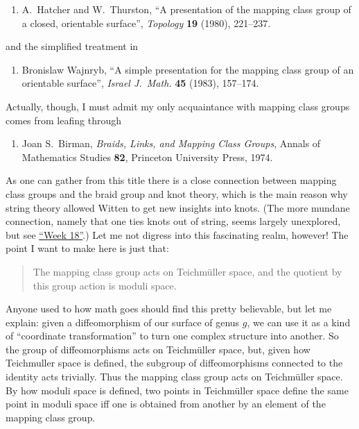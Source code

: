 \documentclass{article}
\def\tightlist{}
\begin{document}
\begin{enumerate}
\def\labelenumi{\arabic{enumi})}
\setcounter{enumi}{4}
\tightlist
\item
  A.\ Hatcher and W.\ Thurston, ``A presentation of the mapping class group of a closed, orientable
  surface'', \emph{Topology} \textbf{19}
  (1980), 221--237.
\end{enumerate}
\noindent
and the simplified treatment in

\begin{enumerate}
\def\labelenumi{\arabic{enumi})}
\setcounter{enumi}{5}
\tightlist
\item
  Bronislaw Wajnryb, ``A simple presentation for the mapping class group of an orientable
  surface'', \emph{Israel J.\ Math.} \textbf{45} (1983), 157--174.
\end{enumerate}
\noindent
Actually, though, I must admit my only acquaintance with mapping class
groups comes from leafing through

\begin{enumerate}
\def\labelenumi{\arabic{enumi})}
\setcounter{enumi}{6}
\tightlist
\item
  Joan S.\ Birman, \emph{Braids, Links, and Mapping Class Groups},
  Annals of Mathematics Studies \textbf{82}, Princeton
  University Press, 1974.
\end{enumerate}

As one can gather from this title there is a close connection between
mapping class groups and the braid group and knot theory, which is the
main reason why string theory allowed Witten to get new insights into
knots. (The more mundane connection, namely that one ties knots out of
string, seems largely unexplored, but see
\protect\hyperlink{week18}{``Week 18''}.) Let me not digress into this
fascinating realm, however! The point I want to make here is just that:

\begin{quote}
The mapping class group acts on Teichm\"uller space, and the quotient by
this group action is moduli space.
\end{quote}

Anyone used to how math goes should find this pretty believable, but let
me explain: given a diffeomorphism of our surface of genus \(g\), we can use
it as a kind of ``coordinate transformation'' to turn one complex
structure into another. So the group of diffeomorphisms acts on
Teichm\"uller space, but, given how Teichmuller space is defined, the
subgroup of diffeomorphisms connected to the identity acts trivially.
Thus the mapping class group acts on Teichm\"uller space. By how moduli
space is defined, two points in Teichm\"uller space define the same point
in moduli space iff one is obtained from another by an element of the
mapping class group.
\end{document}
